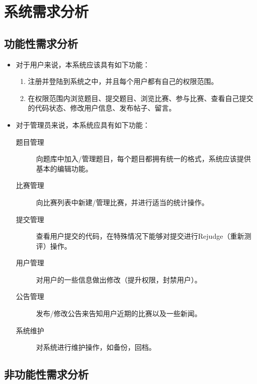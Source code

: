 
\chapter{系统需求分析}
\section{功能性需求分析}
\begin{itemize}
\item 对于用户来说，本系统应该具有如下功能：
\begin{enumerate}
	\item 注册并登陆到系统之中，并且每个用户都有自己的权限范围。
	\item 在权限范围内浏览题目、提交题目、浏览比赛、参与比赛、查看自己提交的代码状态、修改用户信息、发布帖子、留言。
\end{enumerate}
\item 对于管理员来说，本系统应具有如下功能：
\begin{description}
	\item[题目管理] 向题库中加入/管理题目，每个题目都拥有统一的格式，系统应该提供基本的编辑功能。
	\item[比赛管理] 向比赛列表中新建/管理比赛，并进行适当的统计操作。
	\item[提交管理] 查看用户提交的代码，在特殊情况下能够对提交进行Rejudge（重新测评）操作。
	\item[用户管理] 对用户的一些信息做出修改（提升权限，封禁用户）。
	\item[公告管理] 发布/修改公告来告知用户近期的比赛以及一些新闻。
	\item[系统维护] 对系统进行维护操作，如备份，回档。
\end{description}
\end{itemize}

\section{非功能性需求分析}
